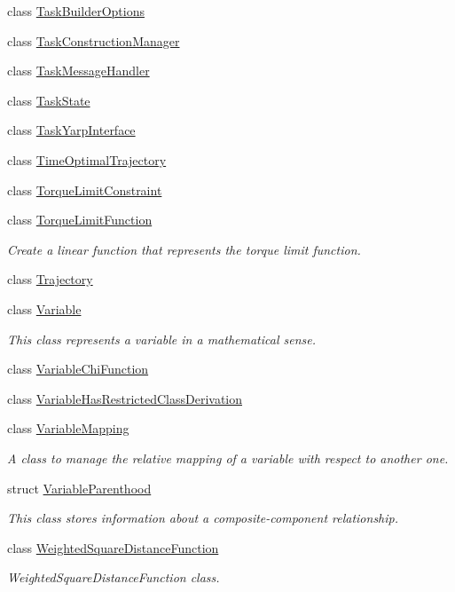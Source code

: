 \begin{DoxyCompactItemize}
class \hyperlink{classocra_1_1TaskBuilderOptions}{Task\+Builder\+Options}
\item 
class \hyperlink{classocra_1_1TaskConstructionManager}{Task\+Construction\+Manager}
\item 
class \hyperlink{classocra_1_1TaskMessageHandler}{Task\+Message\+Handler}
\item 
class \hyperlink{classocra_1_1TaskState}{Task\+State}
\item 
class \hyperlink{classocra_1_1TaskYarpInterface}{Task\+Yarp\+Interface}
\item 
class \hyperlink{classocra_1_1TimeOptimalTrajectory}{Time\+Optimal\+Trajectory}
\item 
class \hyperlink{classocra_1_1TorqueLimitConstraint}{Torque\+Limit\+Constraint}
\item 
class \hyperlink{classocra_1_1TorqueLimitFunction}{Torque\+Limit\+Function}
\begin{DoxyCompactList}\small\item\em Create a linear function that represents the torque limit function. \end{DoxyCompactList}\item 
class \hyperlink{classocra_1_1Trajectory}{Trajectory}
\item 
class \hyperlink{classocra_1_1Variable}{Variable}
\begin{DoxyCompactList}\small\item\em This class represents a variable in a mathematical sense. \end{DoxyCompactList}\item 
class \hyperlink{classocra_1_1VariableChiFunction}{Variable\+Chi\+Function}
\item 
class \hyperlink{classocra_1_1VariableHasRestrictedClassDerivation}{Variable\+Has\+Restricted\+Class\+Derivation}
\item 
class \hyperlink{classocra_1_1VariableMapping}{Variable\+Mapping}
\begin{DoxyCompactList}\small\item\em A class to manage the relative mapping of a variable with respect to another one. \end{DoxyCompactList}\item 
struct \hyperlink{structocra_1_1VariableParenthood}{Variable\+Parenthood}
\begin{DoxyCompactList}\small\item\em This class stores information about a composite-\/component relationship. \end{DoxyCompactList}\item 
class \hyperlink{classocra_1_1WeightedSquareDistanceFunction}{Weighted\+Square\+Distance\+Function}
\begin{DoxyCompactList}\small\item\em Weighted\+Square\+Distance\+Function class. \end{DoxyCompactList}\end{DoxyCompactItemize}

